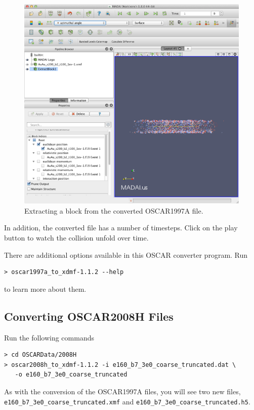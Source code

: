 \documentclass[12pt]{article}
\begin{document}
\begin{figure}[htbp]
   \centering
   \includegraphics[scale=.35]{images/OSCAR1997A_ExtractBlock.png} %
   \caption{Extracting a block from the converted OSCAR1997A file.}
   \label{fig:OSCAR1997A_ExtractBlock}
\end{figure}

In addition, the converted file has a number of timesteps. Click on the play button to watch the collision unfold over time.

There are additional options available in this OSCAR converter program. Run

\begin{verbatim}
> oscar1997a_to_xdmf-1.1.2 --help
\end{verbatim}
to learn more about them.

\subsection{Converting OSCAR2008H Files}

Run the following commands

\begin{verbatim}
> cd OSCARData/2008H
> oscar2008h_to_xdmf-1.1.2 -i e160_b7_3e0_coarse_truncated.dat \
   -o e160_b7_3e0_coarse_truncated
\end{verbatim}

As with the conversion of the OSCAR1997A files, you will see two new files, \\ \texttt{e160\_b7\_3e0\_coarse\_truncated.xmf} and \texttt{e160\_b7\_3e0\_coarse\_truncated.h5}.
\end{document}
